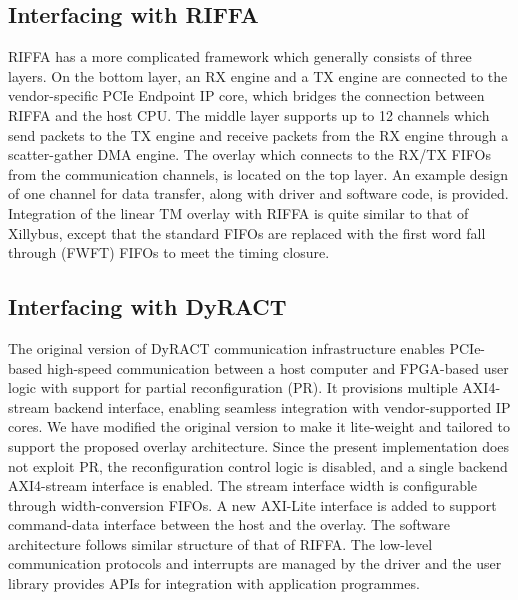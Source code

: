 \subsection{Interfacing with RIFFA}
RIFFA has a more complicated framework which generally consists of three layers. 
On the bottom layer, an RX engine and a TX engine are connected to the vendor-specific PCIe Endpoint IP core, which bridges the connection between RIFFA and the host CPU. 
The middle layer supports up to 12 channels which send packets to the TX engine and receive packets from the RX engine through a scatter-gather DMA engine. 
The overlay which connects to the RX/TX FIFOs from the communication channels, is located on the top layer. 
An example design of one channel for data transfer, along with driver and software code, is provided. 
Integration of the linear TM overlay with RIFFA is quite similar to that of Xillybus, except that the standard FIFOs are replaced with the first word fall through (FWFT) FIFOs to meet the timing closure. 



\subsection{Interfacing with DyRACT}
The original version of DyRACT communication infrastructure enables PCIe-based high-speed communication between a host computer and FPGA-based user logic with support for partial reconfiguration (PR). 
It provisions multiple AXI4-stream backend interface, enabling seamless integration with vendor-supported IP cores. 
We have modified the original version to make it lite-weight and tailored to support the proposed overlay architecture. 
Since the present implementation does not exploit PR, the reconfiguration control logic is disabled, and a single backend AXI4-stream interface is enabled. 
The stream interface width is configurable through width-conversion FIFOs. 
A new AXI-Lite interface is added to support command-data interface between the host and the overlay.
The software architecture follows similar structure of that of RIFFA. 
The low-level communication protocols and interrupts are managed by the driver and the user library provides APIs for integration with application programmes. 


